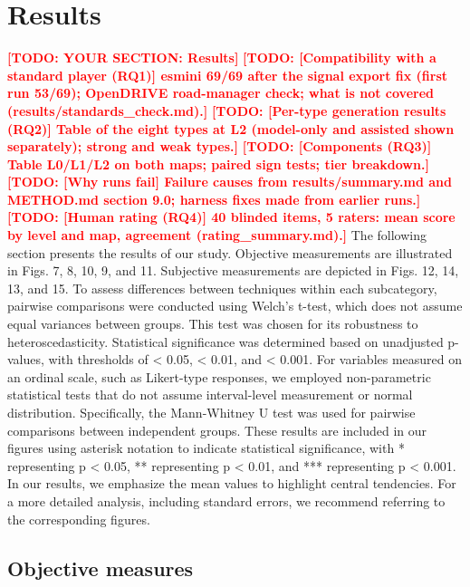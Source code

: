 \documentclass[preprint,12pt]{elsarticle}
\newcommand{\reftext}[1]{{\color{gray}#1}}   %
\newcommand{\todo}[1]{\textcolor{red}{\textbf{[TODO: #1]}}}
\begin{document}
\section{Results}
\todo{YOUR SECTION: Results}
\todo{[Compatibility with a standard player (RQ1)] esmini 69/69 after the signal export fix (first run 53/69); OpenDRIVE road-manager check; what is not covered (results/standards\_check.md).}
\todo{[Per-type generation results (RQ2)] Table of the eight types at L2 (model-only and assisted shown separately); strong and weak types.}
\todo{[Components (RQ3)] Table L0/L1/L2 on both maps; paired sign tests; tier breakdown.}
\todo{[Why runs fail] Failure causes from results/summary.md and METHOD.md section 9.0; harness fixes made from earlier runs.}
\todo{[Human rating (RQ4)] 40 blinded items, 5 raters: mean score by level and map, agreement (rating\_summary.md).}
\reftext{The following section presents the results of our study. Objective measurements are illustrated in Figs. 7, 8, 10, 9, and 11. Subjective measurements are depicted in Figs. 12, 14, 13, and 15. To assess differences between techniques within each subcategory, pairwise comparisons were conducted using Welch's t-test, which does not assume equal variances between groups. This test was chosen for its robustness to heteroscedasticity. Statistical significance was determined based on unadjusted p-values, with thresholds of  < 0.05,  < 0.01, and  < 0.001. For variables measured on an ordinal scale, such as Likert-type responses, we employed non-parametric statistical tests that do not assume interval-level measurement or normal distribution. Specifically, the Mann-Whitney U test was used for pairwise comparisons between independent groups. These results are included in our figures using asterisk notation to indicate statistical significance, with * representing p < 0.05, ** representing p < 0.01, and *** representing p < 0.001. In our results, we emphasize the mean values to highlight central tendencies. For a more detailed analysis, including standard errors, we recommend referring to the corresponding figures.}

\subsection{Objective measures}
\end{document}
